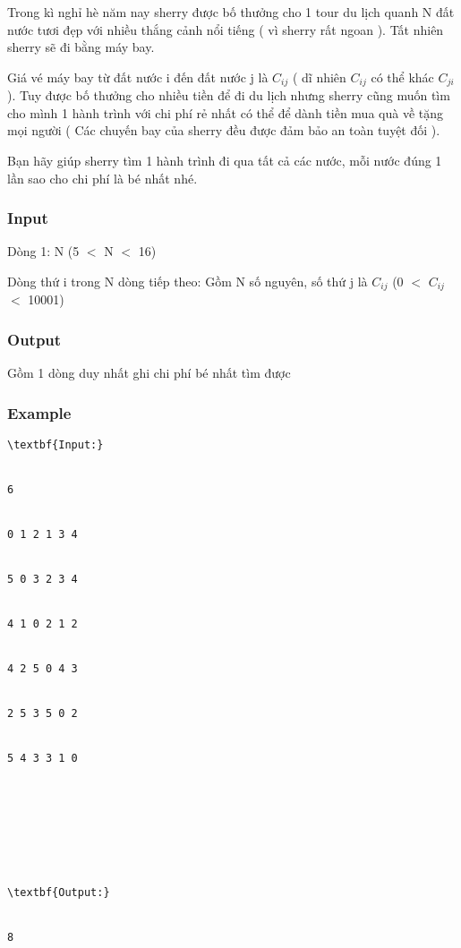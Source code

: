 



   Trong kì nghỉ hè năm nay sherry được bố thưởng cho 1 tour du lịch quanh N đất nước tươi đẹp với nhiều thắng cảnh nổi tiếng ( vì sherry rất ngoan ). Tất nhiên sherry sẽ đi bằng máy bay.  

   Giá vé máy bay từ đất nước i đến đất nước j là $C_{ij}$   ( dĩ nhiên $C_{ij}$   có thể khác $C_{ji}$   ). Tuy được bố thưởng cho nhiều tiền để đi du lịch nhưng sherry cũng muốn tìm cho mình 1 hành trình với chi phí rẻ nhất có thể để dành tiền mua quà về tặng mọi người  ( Các chuyến bay của sherry đều được đảm bảo an toàn tuyệt đối ).  

   Bạn hãy giúp sherry tìm 1 hành trình đi qua tất cả các nước, mỗi nước đúng 1 lần sao cho chi phí là bé nhất nhé.  

\subsubsection{   Input  }

   Dòng 1: N (5 $<$ N $<$ 16)  

   Dòng thứ i trong N dòng tiếp theo: Gồm N số nguyên, số thứ j là $C_{ij}$   (0 $<$ $C_{ij}$   $<$ 10001)  

\subsubsection{   Output  }

   Gồm 1 dòng duy nhất ghi chi phí bé nhất tìm được  

\subsubsection{   Example  }
\begin{verbatim}
\textbf{Input:}


6


0 1 2 1 3 4 


5 0 3 2 3 4 


4 1 0 2 1 2 


4 2 5 0 4 3 


2 5 3 5 0 2 


5 4 3 3 1 0 








\textbf{Output:}


8


\end{verbatim}
